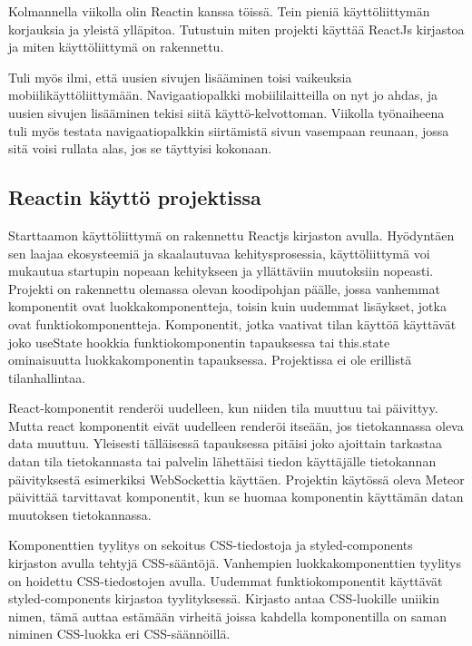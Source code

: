 
Kolmannella viikolla olin Reactin kanssa töissä. Tein pieniä käyttöliittymän korjauksia ja yleistä ylläpitoa. Tutustuin miten projekti käyttää ReactJs kirjastoa ja miten käyttöliittymä on rakennettu.\medskip

Tuli myös ilmi, että uusien sivujen lisääminen toisi vaikeuksia mobiilikäyttöliittymään. Navigaatiopalkki mobiililaitteilla on nyt jo ahdas, ja uusien sivujen lisääminen tekisi siitä käyttö-kelvottoman.
Viikolla työnaiheena tuli myös testata navigaatiopalkkin siirtämistä sivun vasempaan reunaan, jossa sitä voisi rullata alas, jos se täyttyisi kokonaan.\medskip




\subsection*{ Reactin käyttö projektissa }


Starttaamon käyttöliittymä on rakennettu Reactjs kirjaston avulla. Hyödyntäen sen laajaa ekosysteemiä ja skaalautuvaa kehitysprosessia, käyttöliittymä voi mukautua startupin nopeaan kehitykseen ja yllättäviin muutoksiin nopeasti.
Projekti on rakennettu olemassa olevan koodipohjan päälle, jossa vanhemmat komponentit ovat luokkakomponentteja, toisin kuin uudemmat lisäykset, jotka ovat funktiokomponentteja.
Komponentit, jotka vaativat tilan käyttöä käyttävät joko useState hookkia funktiokomponentin tapauksessa tai this.state ominaisuutta luokkakomponentin tapauksessa. Projektissa ei ole erillistä tilanhallintaa.\medskip

React-komponentit renderöi uudelleen, kun niiden tila muuttuu tai päivittyy. Mutta react komponentit eivät uudelleen renderöi itseään, jos tietokannassa oleva data muuttuu. 
Yleisesti tälläisessä tapauksessa pitäisi joko ajoittain tarkastaa datan tila tietokannasta tai palvelin lähettäisi tiedon käyttäjälle tietokannan päivityksestä esimerkiksi WebSockettia käyttäen.
Projektin käytössä oleva Meteor päivittää tarvittavat komponentit, kun se huomaa komponentin käyttämän datan muutoksen tietokannassa.\medskip

Komponenttien tyylitys on sekoitus CSS-tiedostoja ja styled-components kirjaston avulla tehtyjä CSS-sääntöjä.
Vanhempien luokkakomponenttien tyylitys on hoidettu CSS-tiedostojen avulla.
Uudemmat funktiokomponentit käyttävät styled-components kirjastoa tyylityksessä. Kirjasto antaa CSS-luokille uniikin nimen, tämä auttaa estämään virheitä joissa kahdella komponentilla on saman niminen CSS-luokka eri CSS-säännöillä.\medskip



